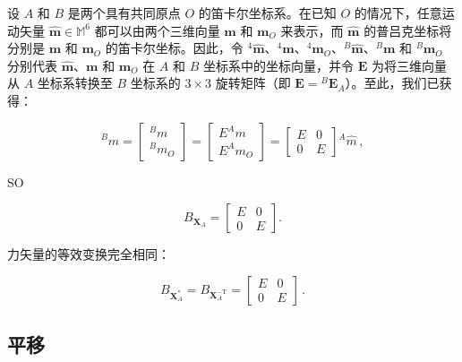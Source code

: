 \documentclass[10pt,a4paper]{book}
\theoremstyle{thmstyle} %
\theoremstyle{defstyle} %
\theoremstyle{prostyle} %
\begin{document}
设 $A$ 和 $B$ 是两个具有共同原点 $O$ 的笛卡尔坐标系。在已知 $O$ 的情况下，任意运动矢量 $\hat{\boldsymbol{m}} \in \mathbb{M}^{6}$ 都可以由两个三维向量 $\boldsymbol{m}$ 和 $\boldsymbol{m}_{O}$ 来表示，而 $\hat{\boldsymbol{m}}$ 的普吕克坐标将分别是 $\boldsymbol{m}$ 和 $\boldsymbol{m}_{O}$ 的笛卡尔坐标。因此，令 ${}^{4} \hat{\boldsymbol{m}}$、${}^{4} \boldsymbol{m}$、${}^{4} \boldsymbol{m}_{O}$、${}^{B} \hat{\boldsymbol{m}}$、${}^{B} \boldsymbol{m}$ 和 ${}^{B} \boldsymbol{m}_{O}$ 分别代表 $\hat{\boldsymbol{m}}$、$\boldsymbol{m}$ 和 $\boldsymbol{m}_{O}$ 在 $A$ 和 $B$ 坐标系中的坐标向量，并令 $\boldsymbol{E}$ 为将三维向量从 $A$ 坐标系转换至 $B$ 坐标系的 $3 \times 3$ 旋转矩阵（即 $\boldsymbol{E} = {}^{B} \boldsymbol{E}_{A}$）。至此，我们已获得：



$$
{ } ^{B} \hat { m } = \left[ \begin{array}{l} { { } ^{B} m } \\{ { } ^{B} m _ { O } } \end{array} \right] = \left[ \begin{array}{l} { { E } ^{A} m } \\{ { E } ^{A} m _ { O } } \end{array} \right] = \left[ \begin{array}{ll} { { E } } & { { 0 } } \\{ { 0 } } & { { E } } \end{array} \right] { } ^{A} \hat { m } \, ,
$$



SO



$$
B _ { \mathbf { X } _ { A } } = \left[ \begin{array}{ll} { E } & { 0 } \\{ 0 } & { E } \end{array} \right] .
$$



力矢量的等效变换完全相同：



$$
B _ { \mathbf { X } _ { A } ^{*} } = B _ { \mathbf { X } _ { A } ^{- \mathrm { T} } } = { \left[ \begin{array}{ll} { E } & { 0 } \\{ 0 } & { E } \end{array} \right] } \, .
$$



\subsection{平移}
\end{document}
